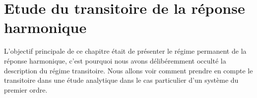\section{Etude du transitoire de la réponse harmonique}
L'objectif principale de ce chapitre était de présenter le régime permanent
de la réponse harmonique, c'est pourquoi nous avons délibéremment occulté 
la description du régime transitoire.
Nous allons voir comment prendre en compte le transitoire dans une étude
analytique dans le cas particulier d'un système du premier ordre.

